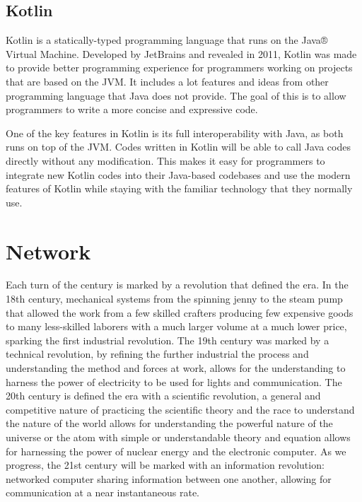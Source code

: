 \subsection{Kotlin}
Kotlin is a statically-typed programming language that runs on the Java® Virtual Machine. Developed by JetBrains and revealed in 2011, Kotlin was made to provide better programming experience for programmers working on projects that are based on the JVM. It includes a lot features and ideas from other programming language that Java does not provide. The goal of this is to allow programmers to write a more concise and expressive code.

One of the key features in Kotlin is its full interoperability with Java, as both runs on top of the JVM. Codes written in Kotlin will be able to call Java codes directly without any modification. This makes it easy for programmers to integrate new Kotlin codes into their Java-based codebases and use the modern features of Kotlin while staying with the familiar technology that they normally use.\cite{kotlin}


\section{Network}
Each turn of the century is marked by a revolution that defined the era. In the 18th century, mechanical systems from the spinning jenny to the steam pump that allowed the work from a few skilled crafters producing few expensive goods to many less-skilled laborers with a much larger volume at a much lower price, sparking the first industrial revolution. The 19th century was marked by a technical revolution, by refining the further industrial the process and understanding the method and forces at work, allows for the understanding to harness the power of electricity to be used for lights and communication. The 20th century is defined the era with a scientific revolution, a general and competitive nature of practicing the scientific theory and the race to understand the nature of the world allows for understanding the powerful nature of the universe or the atom with simple or understandable theory and equation allows for harnessing the power of nuclear energy and the electronic computer. As we progress, the 21st century will be marked with an information revolution: networked computer sharing information between one another, allowing for communication at a near instantaneous rate. \cite{TanenbaumBook}
 
